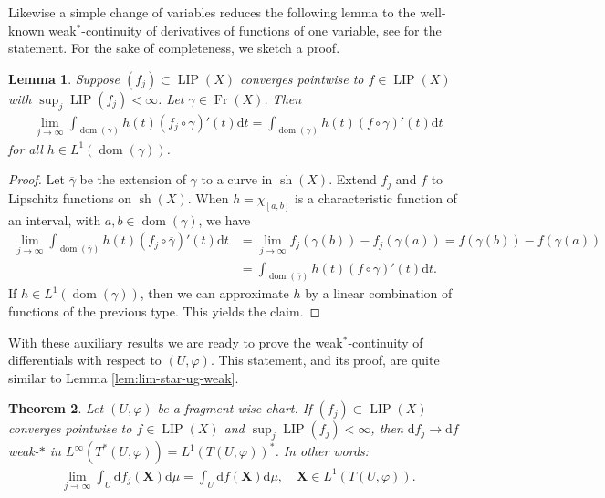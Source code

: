 \documentclass{amsart}
\newtheorem{theorem}{Theorem}[section]
\newtheorem{lemma}[theorem]{Lemma}
\numberwithin{equation}{section}
\newcommand{\LIP}{\operatorname{LIP}}
\newcommand{\dom}{\operatorname{dom}}
\newcommand{\Fr}{\operatorname{Fr}}
\newcommand{\sh}{\operatorname{sh}}
\newcommand{\ud}{\mathrm {d}}
\begin{document}
Likewise a simple change of variables reduces the following lemma to the well-known weak$^*$-continuity of derivatives of functions of one variable, see \cite[Chapter 7, Example 7.1.5]{wea99} for the statement. For the sake of completeness, we sketch a proof.
\begin{lemma}\label{lem:1-dim-weak-star-conv}
	Suppose $(f_j)\subset \LIP(X)$ converges pointwise to $f\in \LIP(X)$ with $\sup_j\LIP(f_j)<\infty$. Let $\gamma\in \Fr(X)$. Then 
	\begin{align*}
		\lim_{j\to\infty}\int_{\dom(\gamma)} h(t)(f_j\circ\gamma)'(t)\ud t=\int_{\dom(\gamma)} h(t)(f\circ\gamma)'(t)\ud t
	\end{align*}
	for all $h\in L^1(\dom(\gamma))$.
\end{lemma}
\begin{proof}
Let $\overline{\gamma}$ be the extension of $\gamma$ to a curve in $\sh(X)$. Extend $f_j$ and $f$ to Lipschitz functions on $\sh(X)$. When $h=\chi_{[a,b]}$ is a characteristic function of an interval, with $a,b\in \dom(\gamma)$, we have 
    \begin{align*}
    \lim_{j\to\infty}\int_{\dom(\overline{\gamma})} h(t)(f_j\circ\overline{\gamma})'(t)\ud t &= \lim_{j\to\infty}f_j(\gamma(b))-f_j(\gamma(a))=f(\gamma(b))-f(\gamma(a))\\
    &=\int_{\dom(\overline{\gamma})} h(t)(f\circ\gamma)'(t)\ud t.
    \end{align*}
    If $h\in L^1(\dom(\gamma))$, then we can approximate $h$ by a linear combination of functions of the previous type. This yields the claim.
\end{proof}
With these auxiliary results we are ready to prove the weak$^*$-continuity of differentials with respect to $(U,\varphi)$. This statement, and its proof, are quite similar to Lemma \ref{lem:lim-star-ug-weak}.

\begin{theorem}\label{thm:diff-w-star-cont}
	Let $(U,\varphi)$ be a fragment-wise chart. If $(f_j)\subset \LIP(X)$ converges pointwise to $f\in \LIP(X)$ and $\sup_j\LIP(f_j)<\infty$, then $\ud f_j \to \ud f$ weak-$\ast$ in $L^\infty(T^*(U,\varphi))=L^1(T(U,\varphi))^*$. In other words:
	\begin{align*}
		\lim_{j\to\infty}\int_U\ud f_j(\bm X)\ud\mu=\int_U\ud f(\bm X)\ud\mu,\quad \bm X\in L^1(T(U,\varphi)).
	\end{align*}
\end{theorem}
\end{document}
